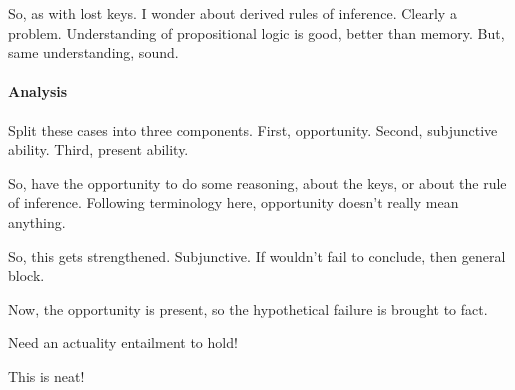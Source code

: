 \begin{note}
  So, as with lost keys.
  I wonder about derived rules of inference.
  Clearly a problem.
  Understanding of propositional logic is good, better than memory.
  But, same understanding, sound.
\end{note}

\paragraph{Analysis}

\begin{note}
  Split these cases into three components.
  First, opportunity.
  Second, subjunctive ability.
  Third, present ability.

  So, have the opportunity to do some reasoning, about the keys, or about the rule of inference.
  Following terminology here, opportunity doesn't really mean anything.

  So, this gets strengthened.
  Subjunctive.
  If wouldn't fail to conclude, then general block.

  Now, the opportunity is present, so the hypothetical failure is brought to fact.

  Need an actuality entailment to hold!

  This is neat!
\end{note}

